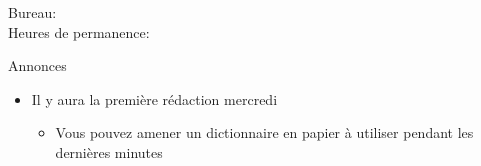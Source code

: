 \documentclass{beamer}
\subtitle[Vie professionnelle]{La vie professionnelle}
\begin{document}
  \begin{frame}
    \titlepage
    \tiny{Bureau: \\
          Heures de permanence: }
  \end{frame}


  \begin{frame}{Annonces}
    \begin{itemize}
      \item Il y aura la première rédaction mercredi
      \begin{itemize}
        \item Vous pouvez amener \alert{un dictionnaire en papier} à utiliser pendant les dernières minutes
      \end{itemize}
    \end{itemize}
  \end{frame}

\end{document}
